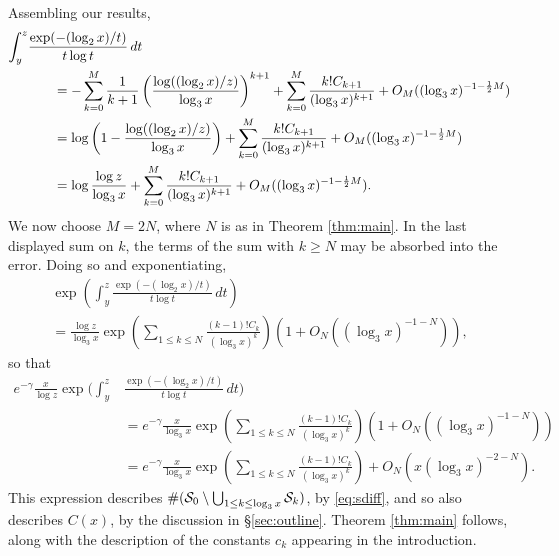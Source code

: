 \documentclass[11pt]{amsart}
\theoremstyle{remark}
\begin{document}
Assembling our results,
\begin{align*} \int_{y}^{z}& \frac{\exp(-(\log_2 x)/t)}{t\log{t}} \,dt \\ &\hphantom{skip}= -\sum_{k=0}^{M} \frac{1}{k+1} \left(\frac{\log((\log_2 x)/z)}{\log_3 x}\right)^{k+1}
 + \sum_{k=0}^{M} \frac{k! C_{k+1}}{(\log_3 x)^{k+1}} + O_M((\log_3 x)^{-1-\frac{1}{2}M})\\
 &\hphantom{skip}= \log\left(1-\frac{\log((\log_2 x)/z)}{\log_3 x}\right)+   \sum_{k=0}^{M} \frac{k! C_{k+1}}{(\log_3 x)^{k+1}} + O_M((\log_3 x)^{-1-\frac{1}{2}M}) \\
 &\hphantom{skip}= \log \frac{\log z}{\log_{3}x} +   \sum_{k=0}^{M} \frac{k! C_{k+1}}{(\log_3 x)^{k+1}} + O_M((\log_3 x)^{-1-\frac{1}{2}M}).\end{align*}
We now choose $M=2N$, where $N$ is as in Theorem \ref{thm:main}.
In the last displayed sum on $k$, the terms of the sum with $k\ge N$ may be absorbed into the error. Doing so and exponentiating,
\begin{multline*} \exp\left(\int_{y}^{z}\frac{\exp(-(\log_2 x)/t)}{t\log{t}} \,dt\right) \\
= \frac{\log{z}}{\log_3 x} \exp\left(\sum_{1 \le k \le N} \frac{(k-1)! C_{k}}{(\log_3 x)^{k}}\right)\left(1 + O_N((\log_3 x)^{-1-N})\right),\end{multline*}
so that
\begin{align*} e^{-\gamma} \frac{x}{\log{z}} \exp\bigg(\int_{y}^{z} &\frac{\exp(-(\log_2 x)/t)}{t\log{t}} \,dt\bigg) \\
&= e^{-\gamma} \frac{x}{\log_3 x}\exp\left(\sum_{1 \le k \le N} \frac{(k-1)! C_k}{(\log_3 x)^k}\right) \left(1 + O_N((\log_3 x)^{-1-N})\right)\\
&= e^{-\gamma} \frac{x}{\log_3 x}\exp\left(\sum_{1 \le k \le N} \frac{(k-1)! C_k}{(\log_3 x)^k}\right) + O_N(x(\log_3 x)^{-2-N}).
\end{align*}
This expression describes $\#(\mathcal{S}_0\setminus \bigcup_{1 \le k \le \log_3 x} \mathcal{S}_k)$, by \eqref{eq:sdiff}, and so also describes $C(x)$, by the discussion in \S\ref{sec:outline}.  Theorem \ref{thm:main} follows, along with the description of the constants $c_k$ appearing in the introduction.
\end{document}
